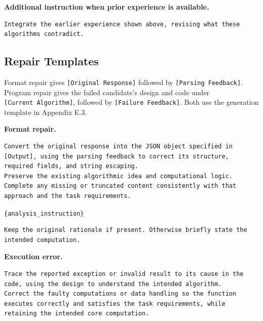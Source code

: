 \documentclass{article}
\begin{document}
\noindent\begin{minipage}{\linewidth}
\textbf{Additional instruction when prior experience is available.}

\begin{verbatim}
Integrate the earlier experience shown above, revising what these algorithms contradict.
\end{verbatim}
\end{minipage}\par

\subsection{Repair Templates}\label{repair-templates}

Format repair gives \texttt{{[}Original\ Response{]}} followed by \texttt{{[}Parsing\ Feedback{]}}. Program repair gives the failed candidate's design and code under \texttt{{[}Current\ Algorithm{]}}, followed by \texttt{{[}Failure\ Feedback{]}}. Both use the generation template in Appendix E.3.

\noindent\begin{minipage}{\linewidth}
\textbf{Format repair.}

\begin{verbatim}
Convert the original response into the JSON object specified in [Output], using the parsing feedback to correct its structure, required fields, and string escaping.
Preserve the existing algorithmic idea and computational logic.
Complete any missing or truncated content consistently with that approach and the task requirements.
\end{verbatim}
\end{minipage}\par

\noindent\begin{minipage}{\linewidth}
\texttt{\{analysis\_instruction\}}

\begin{verbatim}
Keep the original rationale if present. Otherwise briefly state the intended computation.
\end{verbatim}
\end{minipage}\par

\noindent\begin{minipage}{\linewidth}
\textbf{Execution error.}

\begin{verbatim}
Trace the reported exception or invalid result to its cause in the code, using the design to understand the intended algorithm.
Correct the faulty computations or data handling so the function executes correctly and satisfies the task requirements, while retaining the intended core computation.
\end{verbatim}
\end{minipage}\par
\end{document}
